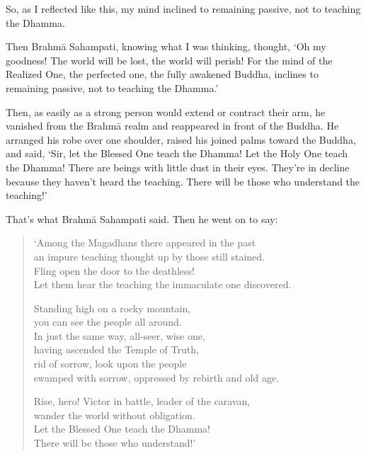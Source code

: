 \documentclass[12pt,openany]{book}%
\begin{document}
So, as I reflected like this, my mind inclined to remaining passive, not to teaching the Dhamma. 

Then \textsanskrit{Brahmā} Sahampati, knowing what I was thinking, thought, ‘Oh my goodness! The world will be lost, the world will perish! For the mind of the Realized One, the perfected one, the fully awakened Buddha, inclines to remaining passive, not to teaching the Dhamma.’ 

Then, as easily as a strong person would extend or contract their arm, he vanished from the \textsanskrit{Brahmā} realm and reappeared in front of the Buddha. He arranged his robe over one shoulder, raised his joined palms toward the Buddha, and said, ‘Sir, let the Blessed One teach the Dhamma! Let the Holy One teach the Dhamma! There are beings with little dust in their eyes. They’re in decline because they haven’t heard the teaching. There will be those who understand the teaching!’ 

That’s what \textsanskrit{Brahmā} Sahampati said. Then he went on to say: 

\begin{verse}%
‘Among the Magadhans there appeared in the past \\
an impure teaching thought up by those still stained. \\
Fling open the door to the deathless! \\
Let them hear the teaching the immaculate one discovered. 

Standing high on a rocky mountain, \\
you can see the people all around. \\
In just the same way, all-seer, wise one, \\
having ascended the Temple of Truth, \\
rid of sorrow, look upon the people \\
swamped with sorrow, oppressed by rebirth and old age. 

Rise, hero! Victor in battle, leader of the caravan, \\
wander the world without obligation. \\
Let the Blessed One teach the Dhamma! \\
There will be those who understand!’ 

%
\end{verse}
\end{document}
